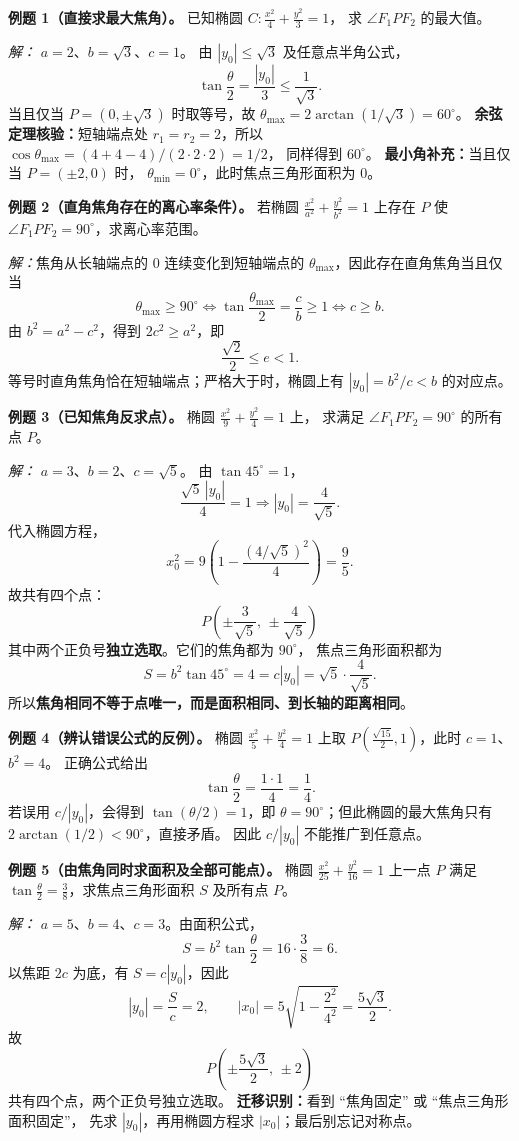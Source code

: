 \begin{examplebox}
\textbf{例题 1（直接求最大焦角）。}
已知椭圆 $C:\frac{x^2}{4}+\frac{y^2}{3}=1$，
求 $\angle F_1PF_2$ 的最大值。

\textit{解：} $a=2$、$b=\sqrt3$、$c=1$。
由 $|y_0|\leq\sqrt3$ 及任意点半角公式，
\[
\tan\frac\theta2=\frac{|y_0|}{3}\leq\frac1{\sqrt3}.
\]
当且仅当 $P=(0,\pm\sqrt3)$ 时取等号，故
$\theta_{\max}=2\arctan(1/\sqrt3)=60^\circ$。
\textbf{余弦定理核验：}短轴端点处 $r_1=r_2=2$，所以
$\cos\theta_{\max}=(4+4-4)/(2\cdot2\cdot2)=1/2$，
同样得到 $60^\circ$。
\textbf{最小角补充：}当且仅当 $P=(\pm2,0)$ 时，
$\theta_{\min}=0^\circ$，此时焦点三角形面积为 $0$。

\medskip
\textbf{例题 2（直角焦角存在的离心率条件）。}
若椭圆 $\frac{x^2}{a^2}+\frac{y^2}{b^2}=1$ 上存在
$P$ 使 $\angle F_1PF_2=90^\circ$，求离心率范围。

\textit{解：}焦角从长轴端点的 $0$ 连续变化到短轴端点的
$\theta_{\max}$，因此存在直角焦角当且仅当
\[
 \theta_{\max}\geq90^\circ
 \iff\tan\frac{\theta_{\max}}2=\frac cb\geq1
 \iff c\geq b.
\]
由 $b^2=a^2-c^2$，得到 $2c^2\geq a^2$，即
\[
 \boxed{\frac{\sqrt2}{2}\leq e<1}.
\]
等号时直角焦角恰在短轴端点；严格大于时，椭圆上有
$|y_0|=b^2/c<b$ 的对应点。

\medskip
\textbf{例题 3（已知焦角反求点）。}
椭圆 $\frac{x^2}{9}+\frac{y^2}{4}=1$ 上，
求满足 $\angle F_1PF_2=90^\circ$ 的所有点 $P$。

\textit{解：} $a=3$、$b=2$、$c=\sqrt5$。
由 $\tan45^\circ=1$，
\[
  \frac{\sqrt5\,|y_0|}{4}=1
  \Longrightarrow |y_0|=\frac4{\sqrt5}.
\]
代入椭圆方程，
\[
  x_0^2=9\left(1-\frac{(4/\sqrt5)^2}{4}\right)
       =\frac95.
\]
故共有四个点：
\[
 \boxed{P\left(\pm\frac3{\sqrt5},\,\pm\frac4{\sqrt5}\right)}
\]
其中两个正负号\textbf{独立选取}。它们的焦角都为 $90^\circ$，
焦点三角形面积都为
\[
 \boxed{S=b^2\tan45^\circ=4}
 =c|y_0|=\sqrt5\cdot\frac4{\sqrt5}.
\]
所以\textbf{焦角相同不等于点唯一，而是面积相同、到长轴的距离相同}。

\medskip
\textbf{例题 4（辨认错误公式的反例）。}
椭圆 $\frac{x^2}{5}+\frac{y^2}{4}=1$ 上取
$P(\frac{\sqrt{15}}2,1)$，此时 $c=1$、$b^2=4$。
正确公式给出
\[
 \boxed{\tan\frac\theta2=\frac{1\cdot1}{4}=\frac14}.
\]
若误用 $c/|y_0|$，会得到 $\tan(\theta/2)=1$，即
$\theta=90^\circ$；但此椭圆的最大焦角只有
$2\arctan(1/2)<90^\circ$，直接矛盾。
因此 $c/|y_0|$ 不能推广到任意点。

\medskip
\textbf{例题 5（由焦角同时求面积及全部可能点）。}
椭圆 $\frac{x^2}{25}+\frac{y^2}{16}=1$ 上一点 $P$ 满足
$\tan\frac\theta2=\frac38$，求焦点三角形面积 $S$ 及所有点 $P$。

\textit{解：} $a=5$、$b=4$、$c=3$。由面积公式，
\[
 \boxed{S=b^2\tan\frac\theta2=16\cdot\frac38=6}.
\]
以焦距 $2c$ 为底，有 $S=c|y_0|$，因此
\[
 |y_0|=\frac Sc=2,
 \qquad
 |x_0|=5\sqrt{1-\frac{2^2}{4^2}}=\frac{5\sqrt3}{2}.
\]
故
\[
 \boxed{P\left(\pm\frac{5\sqrt3}{2},\,\pm2\right)}
\]
共有四个点，两个正负号独立选取。
\textbf{迁移识别：}看到 ``焦角固定'' 或 ``焦点三角形面积固定''，
先求 $|y_0|$，再用椭圆方程求 $|x_0|$；最后别忘记对称点。
\end{examplebox}
